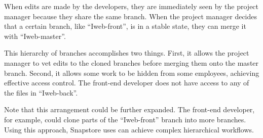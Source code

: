 When edits are made by the developers, they are immediately seen by the project manager because they share the same branch. When the project manager decides that a certain branch, like ``Iweb-front'', is in a stable state, they can merge it with ``Iweb-master''.

This hierarchy of branches accomplishes two things. First, it allows the project manager to vet edits to the cloned branches before merging them onto the master branch. Second, it allows some work to be hidden from some employees, achieving effective access control. The front-end developer does not have access to any of the files in ``Iweb-back''.

Note that this arrangement could be further expanded. The front-end developer, for example, could clone parts of the ``Iweb-front'' branch into more branches. Using this approach, Snapstore uses can achieve complex hierarchical workflows. 




